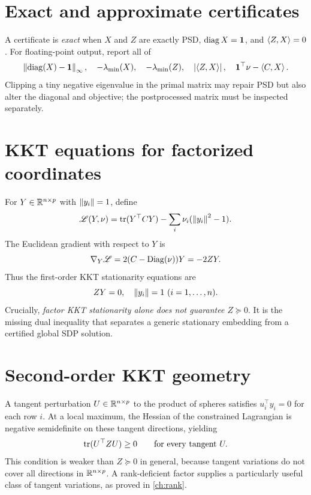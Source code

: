 \section{Exact and approximate certificates}
A certificate is \emph{exact} when $X$ and $Z$ are exactly PSD, $\operatorname{diag} X=\boldsymbol{1}$, and $\left\langle Z,X\right\rangle=0$. For floating-point output, report all of
\begin{equation}
\left\lVert \operatorname{diag}(X)-\boldsymbol{1}\right\rVert_\infty,\quad-\lambda_{\min}(X),\quad-\lambda_{\min}(Z),\quad\left\lvert \left\langle Z,X\right\rangle\right\rvert,\quad\boldsymbol{1}^\top\nu-\left\langle C,X\right\rangle.
\end{equation}
Clipping a tiny negative eigenvalue in the primal matrix may repair PSD but also alter the diagonal and objective; the postprocessed matrix must be inspected separately.

\section{KKT equations for factorized coordinates}
For $Y\in\mathbb{R}^{n\times p}$ with $\left\lVert y_i\right\rVert=1$, define
\[
\mathscr L(Y,\nu)=\operatorname{tr}(Y^\top CY)-\sum_i\nu_i(\left\lVert y_i\right\rVert^2-1).
\]
The Euclidean gradient with respect to $Y$ is
\[
\nabla_Y\mathscr L=2(C-\operatorname{Diag}(\nu))Y=-2ZY.
\]
Thus the first-order KKT stationarity equations are
\begin{equation}\label{eq:factor-kkt}
ZY=0,\quad \left\lVert y_i\right\rVert=1\ (i=1,\ldots,n).
\end{equation}
Crucially, \emph{factor KKT stationarity alone does not guarantee $Z\succeq0$}. It is the missing dual inequality that separates a generic stationary embedding from a certified global SDP solution.

\section{Second-order KKT geometry}
A tangent perturbation $U\in\mathbb{R}^{n\times p}$ to the product of spheres satisfies $u_i^\top y_i=0$ for each row $i$. At a local maximum, the Hessian of the constrained Lagrangian is negative semidefinite on these tangent directions, yielding
\begin{equation}\label{eq:second-order}
\operatorname{tr}(U^\top ZU)\ge0\qquad \text{for every tangent }U.
\end{equation}
This condition is weaker than $Z\succeq0$ in general, because tangent variations do not cover all directions in $\mathbb{R}^{n\times p}$. A rank-deficient factor supplies a particularly useful class of tangent variations, as proved in \cref{ch:rank}.
